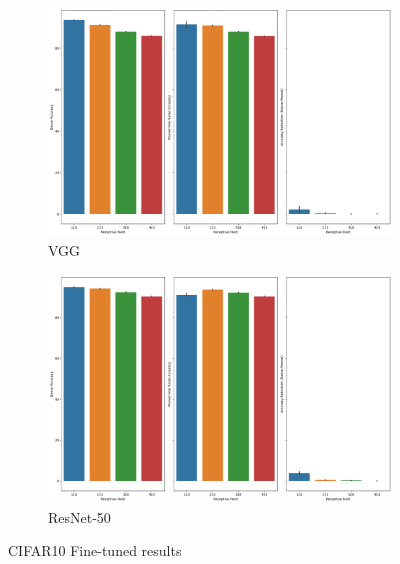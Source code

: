 \begin{figure}[!htb]
 \centering
     \begin{subfigure}[b]{\columnwidth}
    \includegraphics[width=1.1\columnwidth]{images/Supplementary_material/cifar10_vgg19_pruning_finetuned_results_0.9.png}
    \caption{VGG}
    \label{subfig:vgg19CIfar10FInetuned}
     \end{subfigure}
      \hfill
     \begin{subfigure}[b]{\columnwidth}
    \includegraphics[width=1.1\columnwidth]{images/Supplementary_material/cifar10_resnet50_pruning_finetuned_results_0.9.png}
    \caption{ResNet-50}
    \label{subfig:resenet50CIfar10FInetuned}
     \end{subfigure}
     \caption{ CIFAR10 Fine-tuned results}
    \label{fig:finetuned_CIFAR10}
  \end{figure}

